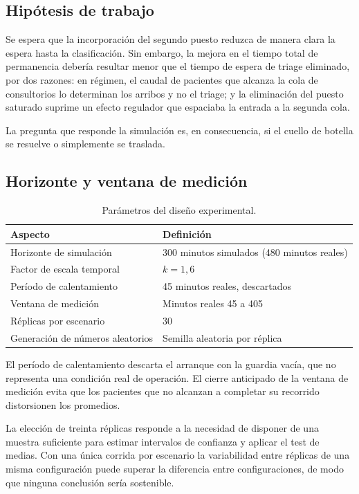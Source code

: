 \documentclass{article}
\begin{document}
\subsection{Hipótesis de trabajo}

Se espera que la incorporación del segundo puesto reduzca de manera clara la
espera hasta la clasificación. Sin embargo, la mejora en el tiempo total de
permanencia debería resultar menor que el tiempo de espera de triage
eliminado, por dos razones: en régimen, el caudal de pacientes que alcanza la
cola de consultorios lo determinan los arribos y no el triage; y la
eliminación del puesto saturado suprime un efecto regulador que espaciaba la
entrada a la segunda cola.

La pregunta que responde la simulación es, en consecuencia, si el cuello de
botella se resuelve o simplemente se traslada.

\subsection{Horizonte y ventana de medición}

\begin{table}[H]
\centering
\begin{tabular}{ll}
\toprule
\textbf{Aspecto} & \textbf{Definición} \\
\midrule
Horizonte de simulación       & 300 minutos simulados (480 minutos reales) \\
Factor de escala temporal     & $k = 1{,}6$ \\
Período de calentamiento      & 45 minutos reales, descartados \\
Ventana de medición           & Minutos reales 45 a 405 \\
Réplicas por escenario        & 30 \\
Generación de números aleatorios & Semilla aleatoria por réplica \\
\bottomrule
\end{tabular}
\caption{Parámetros del diseño experimental.}
\end{table}

El período de calentamiento descarta el arranque con la guardia vacía, que no
representa una condición real de operación. El cierre anticipado de la
ventana de medición evita que los pacientes que no alcanzan a completar su
recorrido distorsionen los promedios.

La elección de treinta réplicas responde a la necesidad de disponer de una
muestra suficiente para estimar intervalos de confianza y aplicar el test de
medias. Con una única corrida por escenario la variabilidad entre réplicas
de una misma configuración puede superar la diferencia entre configuraciones,
de modo que ninguna conclusión sería sostenible.
\end{document}
